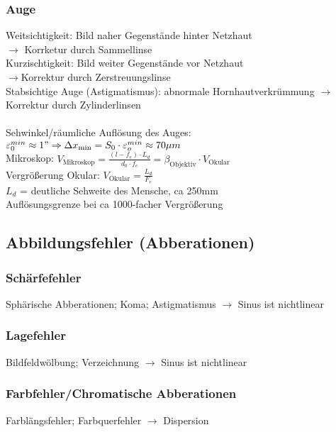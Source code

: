 \documentclass[fs, footer]{latex4ei}
\begin{document}
\begin{multicols*}{4}
\subsubsection{Auge}
Weitsichtigkeit: Bild naher Gegenstände hinter Netzhaut\\
$\rightarrow$ Korrketur durch Sammellinse\\
Kurzischtigkeit: Bild weiter Gegenstände vor Netzhaut\\
$\rightarrow$Korrektur durch Zerstreuungslinse\\
Stabsichtige Auge (Astigmatismus): abnormale Hornhautverkrümmung $\rightarrow$Korrektur durch Zylinderlinsen\\
\\Sehwinkel/räumliche Auflösung des Auges: $\varepsilon_0^{min} \approx 1" \Rightarrow \Delta x_{\text{min}} = S_0\cdot\varepsilon_o^{min} \approx 70 \mu m$\\
Mikroskop: $V_{\text{Mikroskop}} = \frac{(l-f_e)\cdot L_d}{d_0\cdot f_e} = \beta_{\text{Objektiv}}\cdot V_{\text{Okular}}$\\
Vergrößerung Okular: $V_{\text{Okular}} = \frac{L_d}{F_e}$\\
$L_d$ = deutliche Sehweite des Mensche, ca 250mm\\
Auflösungsgrenze bei ca 1000-facher Vergrößerung\\

\subsection{Abbildungsfehler (Abberationen)} %
\subsubsection{Schärfefehler}
Sphärische Abberationen; %
Koma; 
Astigmatismus $\rightarrow$ Sinus ist nichtlinear\\
\subsubsection{Lagefehler}
Bildfeldwölbung; 
Verzeichnung $\rightarrow$ Sinus ist nichtlinear
\subsubsection{Farbfehler/Chromatische Abberationen}
Farblängsfehler; Farbquerfehler $\rightarrow$ Dispersion\\


\end{multicols*}
\end{document}
